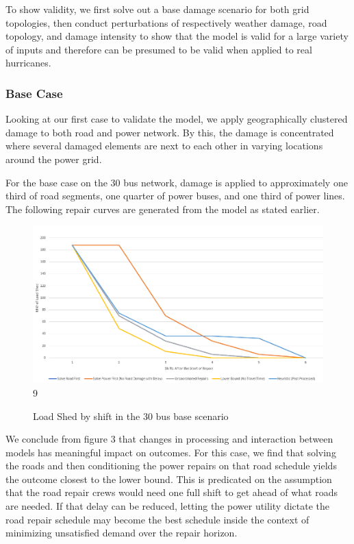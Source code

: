 \documentclass{article}
\begin{document}
	To show validity, we first solve out a base damage scenario for both grid topologies, then conduct perturbations of respectively weather damage, road topology, and damage intensity to show that the model is valid for a large variety of inputs and therefore can be presumed to be valid when applied to real hurricanes. 
	
	\subsubsection{Base Case}
	Looking at our first case to validate the model, we apply geographically clustered damage to both road and power network. By this, the damage is concentrated where several damaged elements are next to each other in varying locations around the power grid. 
	
	For the base case on the 30 bus network, damage is applied to approximately one third of road segments, one quarter of power buses, and one third of power lines. The following repair curves are generated from the model as stated earlier. 
	
	\begin{figure}[H]
		\centering
		
			\centering
			\includegraphics[width=.9\linewidth]{Rplot37.png}9
			\caption{Load Shed by shift in the 30 bus base scenario}
			\label{fig:sub1}
		\end{figure}
	
	We conclude from figure 3 that changes in processing and interaction between models has meaningful impact on outcomes. For this case, we find that solving the roads and then conditioning the power repairs on that road schedule yields the outcome closest to the lower bound. This is predicated on the assumption that the road repair crews would need one full shift to get ahead of what roads are needed. If that delay can be reduced, letting the power utility dictate the road repair schedule may become the best schedule inside the context of minimizing unsatisfied demand over the repair horizon.
	
\end{document}

